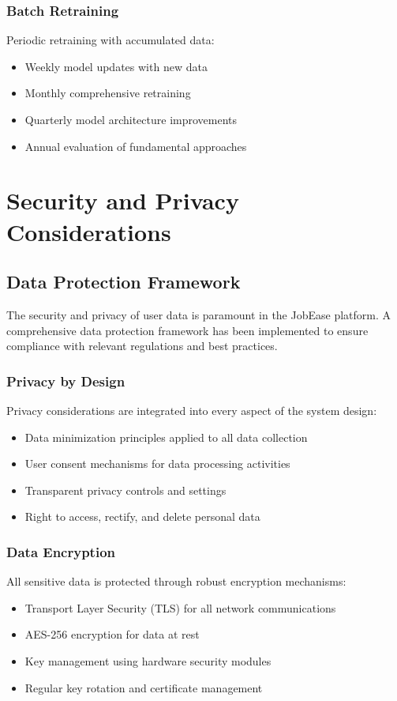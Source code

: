 \documentclass[12pt,a4paper]{report}
\begin{document}
\subsection{Batch Retraining}
Periodic retraining with accumulated data:
\begin{itemize}[leftmargin=2em]
  \item Weekly model updates with new data
  \item Monthly comprehensive retraining
  \item Quarterly model architecture improvements
  \item Annual evaluation of fundamental approaches
\end{itemize}

\chapter{Security and Privacy Considerations}

\section{Data Protection Framework}
The security and privacy of user data is paramount in the JobEase platform. A comprehensive data protection framework has been implemented to ensure compliance with relevant regulations and best practices.

\subsection{Privacy by Design}
Privacy considerations are integrated into every aspect of the system design:
\begin{itemize}[leftmargin=2em]
  \item Data minimization principles applied to all data collection
  \item User consent mechanisms for data processing activities
  \item Transparent privacy controls and settings
  \item Right to access, rectify, and delete personal data
\end{itemize}

\subsection{Data Encryption}
All sensitive data is protected through robust encryption mechanisms:
\begin{itemize}[leftmargin=2em]
  \item Transport Layer Security (TLS) for all network communications
  \item AES-256 encryption for data at rest
  \item Key management using hardware security modules
  \item Regular key rotation and certificate management
\end{itemize}
\end{document}
